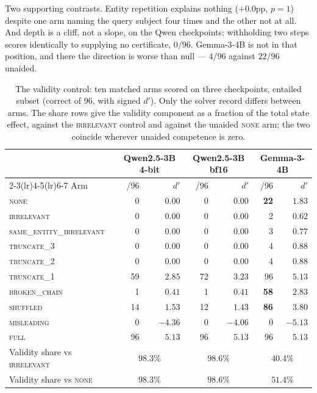 \documentclass{article}
\begin{document}
Two supporting contrasts. Entity repetition explains nothing ($+0.0$pp,
$p = 1$) despite one arm naming the query subject four times and the other not
at all. And depth is a cliff, not a slope, on the Qwen checkpoints: withholding
two steps scores identically to supplying no certificate, $0/96$. Gemma-3-4B is
not in that position, and there the direction is worse than null --- $4/96$
against $22/96$ unaided.

\begin{table}[tb]
\centering\small
\caption{The validity control: ten matched arms scored on three checkpoints, entailed
subset (correct of 96, with signed $d'$). Only the solver record differs between
arms. The share rows give the validity component as a fraction of the total state
effect, against the \textsc{irrelevant} control and against the unaided
\textsc{none} arm; the two coincide wherever unaided competence is zero.}
\label{tab:arms}
\begin{tabular}{lrrrrrr}
\toprule
& \multicolumn{2}{c}{Qwen2.5-3B 4-bit} & \multicolumn{2}{c}{Qwen2.5-3B bf16}
& \multicolumn{2}{c}{Gemma-3-4B} \\
\cmidrule(lr){2-3}\cmidrule(lr){4-5}\cmidrule(lr){6-7}
Arm & /96 & $d'$ & /96 & $d'$ & /96 & $d'$ \\
\midrule
\textsc{none}                    &  0 & $0.00$ &  0 & $0.00$ & \textbf{22} & $1.83$ \\
\textsc{irrelevant}              &  0 & $0.00$ &  0 & $0.00$ &  2 & $0.62$ \\
\textsc{same\_entity\_irrelevant}&  0 & $0.00$ &  0 & $0.00$ &  3 & $0.77$ \\
\textsc{truncate\_3}             &  0 & $0.00$ &  0 & $0.00$ &  4 & $0.88$ \\
\textsc{truncate\_2}             &  0 & $0.00$ &  0 & $0.00$ &  4 & $0.88$ \\
\textsc{truncate\_1}             & 59 & $2.85$ & 72 & $3.23$ & 96 & $5.13$ \\
\textsc{broken\_chain}           &  1 & $0.41$ &  1 & $0.41$ & \textbf{58} & $2.83$ \\
\textsc{shuffled}                & 14 & $1.53$ & 12 & $1.43$ & \textbf{86} & $3.80$ \\
\textsc{misleading}              &  0 & $-4.36$ &  0 & $-4.06$ &  0 & $-5.13$ \\
\textsc{full}                    & 96 & $5.13$ & 96 & $5.13$ & 96 & $5.13$ \\
\midrule
Validity share vs \textsc{irrelevant} & \multicolumn{2}{c}{$98.3\%$}
 & \multicolumn{2}{c}{$98.6\%$} & \multicolumn{2}{c}{$\mathbf{40.4\%}$} \\
Validity share vs \textsc{none}       & \multicolumn{2}{c}{$98.3\%$}
 & \multicolumn{2}{c}{$98.6\%$} & \multicolumn{2}{c}{$\mathbf{51.4\%}$} \\
\bottomrule
\end{tabular}
\end{table}
\end{document}

